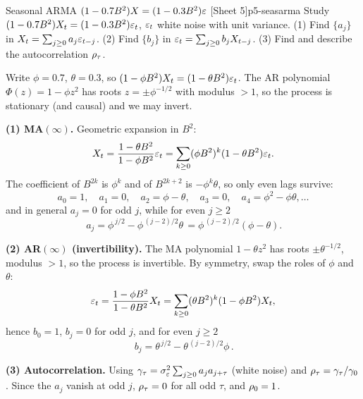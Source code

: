 \begin{exercise}{Seasonal ARMA $(1-0.7B^{2})X=(1-0.3B^{2})\varepsilon$ \quad\textnormal{[Sheet 5]}}{p5-seasarma}
Study $(1-0.7B^{2})X_t=(1-0.3B^{2})\varepsilon_t$, $\varepsilon_t$ white noise with unit
variance.
(1) Find $\{a_j\}$ in $X_t=\sum_{j\ge0}a_j\varepsilon_{t-j}$.
(2) Find $\{b_j\}$ in $\varepsilon_t=\sum_{j\ge0}b_jX_{t-j}$.
(3) Find and describe the autocorrelation $\rho_\tau$.
\end{exercise}
\begin{solution}
Write $\phi=0.7$, $\theta=0.3$, so $(1-\phi B^{2})X_t=(1-\theta B^{2})\varepsilon_t$.
The AR polynomial $\Phi(z)=1-\phi z^{2}$ has roots $z=\pm\phi^{-1/2}$ with
modulus $>1$, so the process is stationary (and causal) and we may invert.

\textbf{(1) MA$(\infty)$.} Geometric expansion in $B^{2}$:
\[
X_t=\frac{1-\theta B^{2}}{1-\phi B^{2}}\varepsilon_t
=\sum_{k\ge0}(\phi B^{2})^{k}(1-\theta B^{2})\varepsilon_t .
\]
The coefficient of $B^{2k}$ is $\phi^{k}$ and of $B^{2k+2}$ is $-\phi^{k}\theta$,
so only even lags survive:
\[
a_0=1,\quad a_1=0,\quad a_2=\phi-\theta,\quad a_3=0,\quad a_4=\phi^{2}-\phi\theta,
\dots
\]
and in general $a_j=0$ for odd $j$, while for even $j\ge2$
\[
\boxed{\,a_j=\phi^{\,j/2}-\phi^{\,(j-2)/2}\theta\,}
=\phi^{\,(j-2)/2}(\phi-\theta).
\]

\textbf{(2) AR$(\infty)$ (invertibility).} The MA polynomial
$1-\theta z^{2}$ has roots $\pm\theta^{-1/2}$, modulus $>1$, so the process is
invertible. By symmetry, swap the roles of $\phi$ and $\theta$:
\[
\varepsilon_t=\frac{1-\phi B^{2}}{1-\theta B^{2}}X_t=\sum_{k\ge0}(\theta B^{2})^{k}(1-\phi B^{2})X_t,
\]
hence $b_0=1$, $b_j=0$ for odd $j$, and for even $j\ge2$
\[
\boxed{\,b_j=\theta^{\,j/2}-\theta^{\,(j-2)/2}\phi\,.}
\]

\textbf{(3) Autocorrelation.} Using
$\gamma_\tau=\sigma_\varepsilon^2\sum_{j\ge0}a_j a_{j+\tau}$ (white noise) and
$\rho_\tau=\gamma_\tau/\gamma_0$. Since the $a_j$ vanish at odd $j$, $\rho_\tau=0$
for all odd $\tau$, and $\rho_0=1$.


\end{solution}
